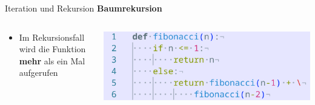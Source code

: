 \documentclass[aspectratio=169]{beamer}
\begin{document}
\begin{frame}{Iteration und Rekursion}
    \textbf{Baumrekursion}
    \begin{columns}
        \begin{column}{0.5\textwidth}
            \begin{itemize}
                \item Im Rekursionsfall wird die Funktion \textbf{mehr} als ein Mal aufgerufen
            \end{itemize}
        \end{column}
        \pause
        \begin{column}{0.5\textwidth}
            \begin{tcolorbox}[colframe=oxfordblue, colback=blue!10, coltitle=white, title=Python]
                \includegraphics[width=\textwidth]{images/code_recursionfibonacci.png}
            \end{tcolorbox}
        \end{column}
    \end{columns}
\end{frame}
\end{document}

